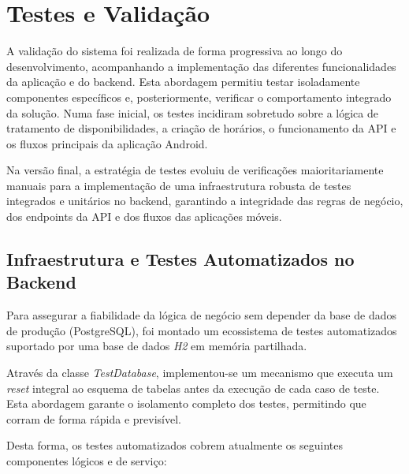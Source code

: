 %
%
\chapter{Testes e Validação} \label{cap:testes}

A validação do sistema foi realizada de forma progressiva ao longo do desenvolvimento, acompanhando a implementação das diferentes funcionalidades da aplicação e do backend.
Esta abordagem permitiu testar isoladamente componentes específicos e, posteriormente, verificar o comportamento integrado da solução. Numa fase inicial, os testes incidiram sobretudo sobre a lógica de tratamento de disponibilidades, a criação de horários, o funcionamento da API e os fluxos principais da aplicação Android.

Na versão final, a estratégia de testes evoluiu de verificações maioritariamente manuais para a implementação de uma infraestrutura robusta de testes integrados e unitários no backend, garantindo a integridade das regras de negócio, dos endpoints da API e dos fluxos das aplicações móveis.

\section{Infraestrutura e Testes Automatizados no Backend}

Para assegurar a fiabilidade da lógica de negócio sem depender da base de dados de produção (PostgreSQL), foi montado um ecossistema de testes automatizados suportado por uma base de dados \textit{H2} em memória partilhada.

Através da classe \textit{TestDatabase}, implementou-se um mecanismo que executa um \textit{reset} integral ao esquema de tabelas antes da execução de cada caso de teste. Esta abordagem garante o isolamento completo dos testes, permitindo que corram de forma rápida e previsível.

Desta forma, os testes automatizados cobrem atualmente os seguintes componentes lógicos e de serviço:

